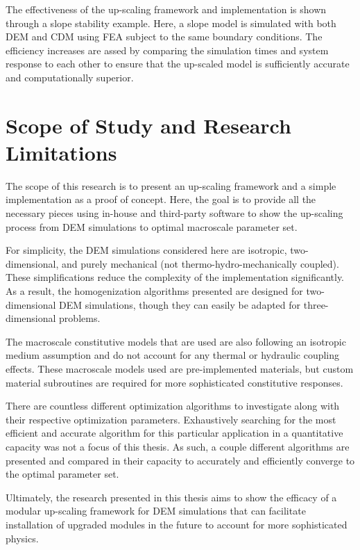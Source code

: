 The effectiveness of the up-scaling framework and implementation is shown through a slope stability example. Here, a slope model is simulated with both DEM and CDM using FEA subject to the same boundary conditions. The efficiency increases are assed by comparing the simulation times and system response to each other to ensure that the up-scaled model is sufficiently accurate and computationally superior.

\section{Scope of Study and Research Limitations}

The scope of this research is to present an up-scaling framework and a simple implementation as a proof of concept. Here, the goal is to provide all the necessary pieces using in-house and third-party software to show the up-scaling process from DEM simulations to optimal macroscale parameter set. 

For simplicity, the DEM simulations considered here are isotropic, two-dimensional, and purely mechanical (not thermo-hydro-mechanically coupled). These simplifications reduce the complexity of the implementation significantly. As a result, the homogenization algorithms presented are designed for two-dimensional DEM simulations, though they can easily be adapted for three-dimensional problems.

The macroscale constitutive models that are used are also following an isotropic medium assumption and do not account for any thermal or hydraulic coupling effects. These macroscale models used are pre-implemented materials, but custom material subroutines are required for more sophisticated constitutive responses. 

There are countless different optimization algorithms to investigate along with their respective optimization parameters. Exhaustively searching for the most efficient and accurate algorithm for this particular application in a quantitative capacity was not a focus of this thesis. As such, a couple different algorithms are presented and compared in their capacity to accurately and efficiently converge to the optimal parameter set.

Ultimately, the research presented in this thesis aims to show the efficacy of a modular up-scaling framework for DEM simulations that can facilitate installation of upgraded modules in the future to account for more sophisticated physics.
